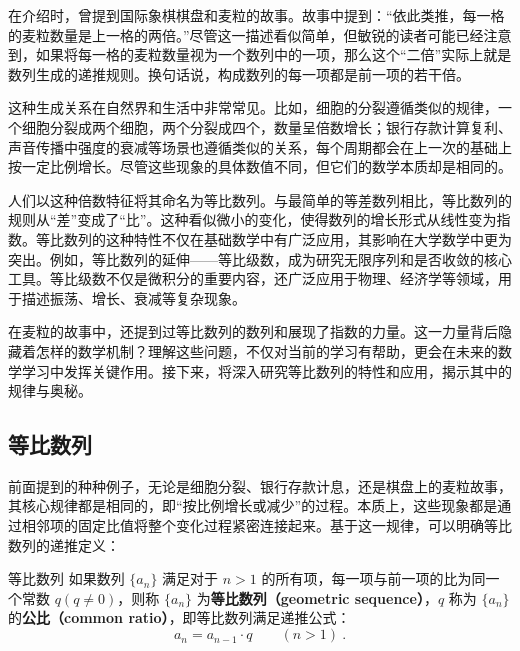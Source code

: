 
\begin{issues}
\issueDraft
\end{issues}


在介绍时，曾提到国际象棋棋盘和麦粒的故事。故事中提到：“依此类推，每一格的麦粒数量是上一格的两倍。”尽管这一描述看似简单，但敏锐的读者可能已经注意到，如果将每一格的麦粒数量视为一个数列中的一项，那么这个“二倍”实际上就是数列生成的递推规则。换句话说，构成数列的每一项都是前一项的若干倍。

这种生成关系在自然界和生活中非常常见。比如，细胞的分裂遵循类似的规律，一个细胞分裂成两个细胞，两个分裂成四个，数量呈倍数增长；银行存款计算复利、声音传播中强度的衰减等场景也遵循类似的关系，每个周期都会在上一次的基础上按一定比例增长。尽管这些现象的具体数值不同，但它们的数学本质却是相同的。

人们以这种倍数特征将其命名为等比数列。与最简单的等差数列相比，等比数列的规则从“差”变成了“比”。这种看似微小的变化，使得数列的增长形式从线性变为指数。等比数列的这种特性不仅在基础数学中有广泛应用，其影响在大学数学中更为突出。例如，等比数列的延伸——等比级数，成为研究无限序列和是否收敛的核心工具。等比级数不仅是微积分的重要内容，还广泛应用于物理、经济学等领域，用于描述振荡、增长、衰减等复杂现象。

在麦粒的故事中，还提到过等比数列的数列和展现了指数的力量。这一力量背后隐藏着怎样的数学机制？理解这些问题，不仅对当前的学习有帮助，更会在未来的数学学习中发挥关键作用。接下来，将深入研究等比数列的特性和应用，揭示其中的规律与奥秘。

\subsection{等比数列}

前面提到的种种例子，无论是细胞分裂、银行存款计息，还是棋盘上的麦粒故事，其核心规律都是相同的，即“按比例增长或减少”的过程。本质上，这些现象都是通过相邻项的固定比值将整个变化过程紧密连接起来。基于这一规律，可以明确等比数列的递推定义：

\begin{definition}{等比数列}
如果数列 $\{a_n\}$ 满足对于 $n > 1$ 的所有项，每一项与前一项的比为同一个常数 $q(q\neq0)$，则称 $\{a_n\}$ 为\textbf{等比数列（geometric sequence）}，$q$ 称为 $\{a_n\}$ 的\textbf{公比（common ratio）}，即等比数列满足递推公式：
\begin{equation}
a_{n}=a_{n-1}\cdot q\qquad(n>1)~.
\end{equation}
\end{definition}

